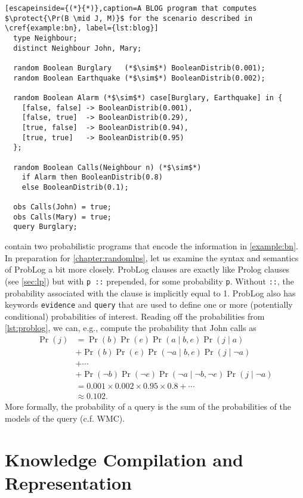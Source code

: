 \begin{lstlisting}[escapeinside={(*}{*)},caption=A BLOG program that computes $\protect{\Pr(B \mid J, M)}$ for the scenario described in \cref{example:bn}, label={lst:blog}]
  type Neighbour;
  distinct Neighbour John, Mary;

  random Boolean Burglary   (*$\sim$*) BooleanDistrib(0.001);
  random Boolean Earthquake (*$\sim$*) BooleanDistrib(0.002);

  random Boolean Alarm (*$\sim$*) case[Burglary, Earthquake] in {
    [false, false] -> BooleanDistrib(0.001),
    [false, true]  -> BooleanDistrib(0.29),
    [true, false]  -> BooleanDistrib(0.94),
    [true, true]   -> BooleanDistrib(0.95)
  };

  random Boolean Calls(Neighbour n) (*$\sim$*)
    if Alarm then BooleanDistrib(0.8)
    else BooleanDistrib(0.1);

  obs Calls(John) = true;
  obs Calls(Mary) = true;
  query Burglary;
\end{lstlisting}

 contain two probabilistic programs that encode the information in \cref{example:bn}. In preparation for \cref{chapter:randomlps}, let us examine the syntax and semantics of ProbLog a bit more closely. ProbLog clauses are exactly like Prolog clauses (see \cref{sec:lp}) but with \verb+p ::+ prepended, for some probability \texttt{p}. Without \verb+::+, the probability associated with the clause is implicitly equal to 1. ProbLog also has keywords \texttt{evidence} and \texttt{query} that are used to define one or more (potentially conditional) probabilities of interest. Reading off the probabilities from \cref{lst:problog}, we can, e.g., compute the probability that John calls as
\begin{align*}
  \Pr(j) &= \Pr(b)\Pr(e)\Pr(a \mid b, e)\Pr(j \mid a) \\
  &+ \Pr(b)\Pr(e)\Pr(\neg a \mid b, e)\Pr(j \mid \neg a) \\
  &+ \cdots \\
  &+ \Pr(\neg b)\Pr(\neg e)\Pr(\neg a \mid \neg b, \neg e)\Pr(j \mid \neg a) \\
  &= 0.001 \times 0.002 \times 0.95 \times 0.8 + \cdots \\
  &\approx 0.102.
\end{align*}
More formally, the probability of a query is the sum of the probabilities of the models of the query (c.f. WMC).

\section{Knowledge Compilation and Representation} \label{sec:kc}

